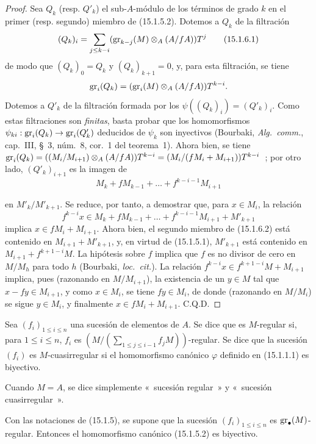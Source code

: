 \begin{proof}
Sea $Q_k$ (resp. $Q'_k$) el sub-$A$-módulo de los términos de grado $k$ en
el primer (resp. segundo) miembro de (15.1.5.2). Dotemos a $Q_k$ de la filtración
\[
  (Q_k)_i=\sum_{j\leq k-i}
  (\operatorname{gr}_{k-j}(M)\otimes_A(A/fA))T^j
  \tag{15.1.6.1}\label{0.15.1.6.1-fr}
\]
de modo que $(Q_k)_0=Q_k$ y $(Q_k)_{k+1}=0$, y, para esta filtración, se tiene
\[
  \operatorname{gr}_i(Q_k)=(\operatorname{gr}_i(M)\otimes_A(A/fA))T^{k-i}.
\]
Dotemos a $Q'_k$ de la filtración formada por los
$\psi((Q_k)_i)=(Q'_k)_i$. Como estas filtraciones son \emph{finitas}, basta
probar que los homomorfismos $\psi_{ki}:\operatorname{gr}_i(Q_k)\to\operatorname{gr}_i(Q'_k)$ deducidos de
$\psi_k$ son inyectivos (Bourbaki, \emph{Alg.~comm.}, cap.~III, \S~3,
núm.~8, cor.~1 del teorema~1). Ahora bien, se tiene
$\operatorname{gr}_i(Q_k)=((M_i/M_{i+1})\otimes_A(A/fA))T^{k-i}=(M_i/(fM_i+M_{i+1}))T^{k-i}$~;
por otro lado, $(Q'_k)_{i+1}$ es la imagen de
\[
  M_k+fM_{k-1}+\ldots+f^{k-i-1}M_{i+1}
\]

en $M'_k/M'_{k+1}$. Se reduce, por tanto, a demostrar que, para $x\in M_i$,
la relación
\[
  f^{k-i}x\in M_k+fM_{k-1}+\ldots+
  f^{k-i-1}M_{i+1}+M'_{k+1}
  \tag{15.1.6.2}\label{0.15.1.6.2-fr}
\]
implica $x\in fM_i+M_{i+1}$. Ahora bien, el segundo miembro de (15.1.6.2) está
contenido en $M_{i+1}+M'_{k+1}$, y, en virtud de (15.1.5.1), $M'_{k+1}$ está
contenido en $M_{i+1}+f^{k+1-i}M$. La hipótesis sobre $f$ implica que $f$ es
no divisor de cero en $M/M_h$ para todo $h$ (Bourbaki, \emph{loc.~cit.}). La
relación $f^{k-i}x\in f^{k+1-i}M+M_{i+1}$ implica, pues (razonando 
en
$M/M_{i+1}$), la existencia de un $y\in M$ tal que $x-fy\in M_{i+1}$, y como
$x\in M_i$, se tiene $fy\in M_i$, de donde (razonando en $M/M_i$) se sigue
$y\in M_i$, y finalmente $x\in fM_i+M_{i+1}$. C.Q.D.
\end{proof}

\begin{definition}[15.1.7]
\label{0.15.1.7-fr}
Sea $(f_i)_{1\leq i\leq n}$ una sucesión de elementos de $A$. Se dice que es
$M$-regular si, para $1\leq i\leq n$, $f_i$ es
$\left(M/(\sum_{1\leq j\leq i-1}f_jM)\right)$-regular. Se dice que la sucesión
$(f_i)$ es $M$-cuasirregular si el homomorfismo canónico $\varphi$
definido en (15.1.1.1) es biyectivo.

Cuando $M=A$, se dice simplemente «~sucesión regular~» y
«~sucesión cuasirregular~».
\end{definition}

\begin{proposition}[15.1.8]
\label{0.15.1.8-fr}
Con las notaciones de (15.1.5), se supone que la sucesión
$(f_i)_{1\leq i\leq n}$ es $\operatorname{gr}_\bullet(M)$-regular. Entonces
el homomorfismo canónico (15.1.5.2) es biyectivo.
\end{proposition}

